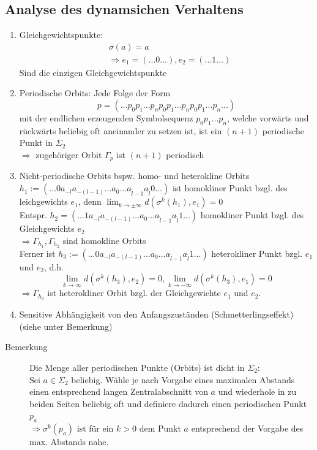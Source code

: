 \documentclass[a4paper, 13pt]{scrreprt}
\theoremstyle{definition} \newtheorem{definition}{Definition}[section]
\begin{document}
\subsection{Analyse des dynamsichen Verhaltens}

\begin{enumerate}
	\item{Gleichgewichtspunkte:}
		\begin{align*}
			&\sigma(a)=a \\
			& \Rightarrow e_1=(...0...), e_2=(...1...)
		\end{align*}
		Sind die einzigen Gleichgewichtspunkte
	\item{Periodische Orbits:} Jede Folge der Form
		\[p=(...p_0p_1...p_np_0p_1...p_np_0p_1...p_n...) \]
		mit der endlichen erzeugenden Symbolsequenz \(p_0p_1...p_n\), welche vorwärts und rückwärts beliebig oft aneinander zu setzen ist, ist ein \((n+1)\) periodische Punkt in \(\Sigma_2\)\\
		\(\Rightarrow\) zugehöriger Orbit \(\Gamma_p\) ist \((n+1)\) periodisch
	\item{Nicht-periodische Orbits} bspw. homo- und heterokline Orbits\\
		\(h_1 := (...0a_{-l}a_{-(l-1)}...a_0...a_{\tilde{l}-1}a_{\tilde{l}}0...)\) ist homokliner Punkt bzgl. des leichgewichts \(e_1\), denn \(\lim_{k\to\pm\infty} d(\sigma^k(h_1),e_1) = 0\)\\
		Entspr. \(h_2=(...1a_{-l}a_{-(l-1)}...a_0...a_{\tilde{l}-1}a_{\tilde{l}}1...)\) homokliner Punkt bzgl. des Gleichgewichts \(e_2\)\\
		\(\Rightarrow \Gamma_{h_1}, \Gamma_{h_2}\) sind homokline Orbits\\
		Ferner ist \(h_3:=(...0a_{-l}a_{-(l-1)}...a_0...a_{\tilde{l}-1}a_{\tilde{l}}1...)\) heterokliner Punkt bzgl. \(e_1\) und \(e_2\), d.h. 
		\[\lim_{k\to\infty} d(\sigma^k(h_3),e_2) = 0, \lim_{k\to -\infty} d(\sigma^k(h_3),e_1)=0\]
		\(\Rightarrow \Gamma_{h_3}\) ist heterokliner Orbit bzgl. der Gleichgewichte \(e_1\) und \(e_2\).
		\item{Sensitive Abhängigkeit von den Anfangszuständen }(Schmetterlingseffekt) (siehe unter Bemerkung)
\end{enumerate}

\begin{description}
	\item[Bemerkung] Die Menge aller periodischen Punkte (Orbits) ist dicht in \(\Sigma_2\):\\
	Sei \(a\in \Sigma_2\) beliebig. Wähle je nach Vorgabe eines maximalen Abstands einen entsprechend langen Zentralabschnitt von \(a\) und wiederhole in zu beiden Seiten beliebig oft und definiere dadurch einen periodischen Punkt \(p_a\)\\
	\(\Rightarrow \sigma^k(p_a)\) ist für ein \(k>0\) dem Punkt \(a\) entsprechend der Vorgabe des max. Abstands nahe.
\end{description}
\end{document}
